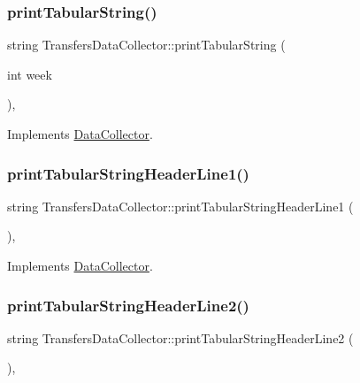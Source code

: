 \subsubsection{\texorpdfstring{print\+Tabular\+String()}{printTabularString()}}
{\footnotesize\ttfamily string Transfers\+Data\+Collector\+::print\+Tabular\+String (\begin{DoxyParamCaption}\item[{int}]{week }\end{DoxyParamCaption})\hspace{0.3cm}{\ttfamily [override]}, {\ttfamily [virtual]}}



Implements \mbox{\hyperlink{classDataCollector_a397fccabe0223267eea8fc7cac0e59da}{Data\+Collector}}.

\mbox{\label{classTransfersDataCollector_a7c797fbccf4326b206b29529059dd622}} 
\subsubsection{\texorpdfstring{print\+Tabular\+String\+Header\+Line1()}{printTabularStringHeaderLine1()}}
{\footnotesize\ttfamily string Transfers\+Data\+Collector\+::print\+Tabular\+String\+Header\+Line1 (\begin{DoxyParamCaption}{ }\end{DoxyParamCaption})\hspace{0.3cm}{\ttfamily [override]}, {\ttfamily [virtual]}}



Implements \mbox{\hyperlink{classDataCollector_a91619cfa9e9b8cefd2f7c20d5718b41e}{Data\+Collector}}.

\mbox{\label{classTransfersDataCollector_ade6b896383f079d8973076e6b9a8053a}} 
\subsubsection{\texorpdfstring{print\+Tabular\+String\+Header\+Line2()}{printTabularStringHeaderLine2()}}
{\footnotesize\ttfamily string Transfers\+Data\+Collector\+::print\+Tabular\+String\+Header\+Line2 (\begin{DoxyParamCaption}{ }\end{DoxyParamCaption})\hspace{0.3cm}{\ttfamily [override]}, {\ttfamily [virtual]}}



